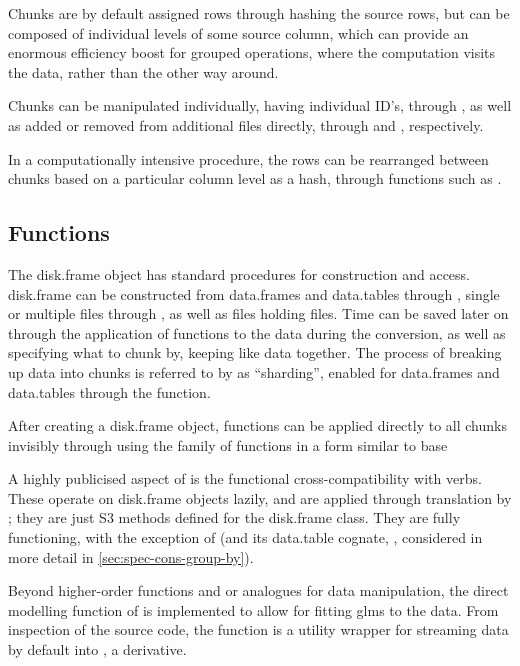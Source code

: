 Chunks are by default assigned rows through hashing the source rows, but
can be composed of individual levels of some source column, which can
provide an enormous efficiency boost for grouped operations, where the
computation visits the data, rather than the other way around.

Chunks can be manipulated individually, having individual ID's, through
, as well as added or
removed from additional  files directly, through
 and
, respectively.

In a computationally intensive procedure, the rows can be rearranged
between chunks based on a particular column level as a hash, through
functions such as .

\subsection{Functions}\label{sec:functions}

The disk.frame object has standard procedures for construction and
access. disk.frame can be constructed from data.frames and data.tables
through , single or
multiple  files through
, as well as 
files holding  files. Time can be saved later on through the
application of functions to the data during the conversion, as well as
specifying what to chunk by, keeping like data together. The process of
breaking up data into chunks is referred to by  as
``sharding'', enabled for data.frames and data.tables through the
 function.

After creating a disk.frame object, functions can be applied directly to
all chunks invisibly through using the
 family of functions in a form
similar to base \R {}

A highly publicised aspect of  is the functional
cross-compatibility with  verbs. These operate on disk.frame
objects lazily, and are applied through translation by ; they
are just S3 methods defined for the disk.frame class. They are fully
functioning, with the exception of  (and its
data.table cognate, , considered in more detail in
\cref{sec:spec-cons-group-by}).

Beyond higher-order functions and  or  analogues for data
manipulation, the direct modelling function of
 is implemented to allow for
fitting glms to the data. From inspection of the source code, the
function is a utility wrapper for streaming  data by default
into , a  derivative.

